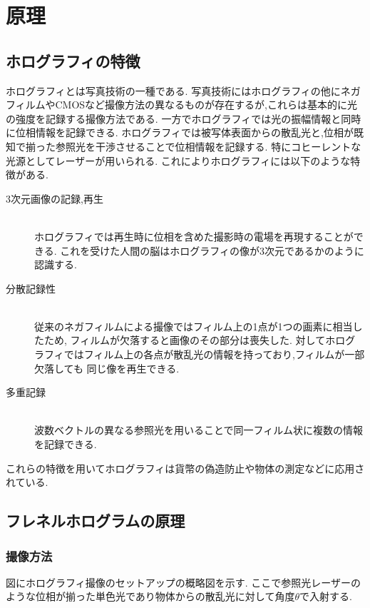\section{原理}
\subsection{ホログラフィの特徴}
ホログラフィとは写真技術の一種である.
写真技術にはホログラフィの他にネガフィルムやCMOSなど撮像方法の異なるものが存在するが,これらは基本的に光の強度を記録する撮像方法である.
一方でホログラフィでは光の振幅情報と同時に位相情報を記録できる.
ホログラフィでは被写体表面からの散乱光と,位相が既知で揃った参照光を干渉させることで位相情報を記録する.
特にコヒーレントな光源としてレーザーが用いられる.
これによりホログラフィには以下のような特徴がある.
\begin{description}
  \item [3次元画像の記録,再生] \text{ }\\
  ホログラフィでは再生時に位相を含めた撮影時の電場を再現することができる.
  これを受けた人間の脳はホログラフィの像が3次元であるかのように認識する.
  \item [分散記録性] \text{ }\\
  従来のネガフィルムによる撮像ではフィルム上の1点が1つの画素に相当したため,
  フィルムが欠落すると画像のその部分は喪失した.
  対してホログラフィではフィルム上の各点が散乱光の情報を持っており,フィルムが一部欠落しても
  同じ像を再生できる.
  \item [多重記録] \text{ }\\
  波数ベクトルの異なる参照光を用いることで同一フィルム状に複数の情報を記録できる.
\end{description}
これらの特徴を用いてホログラフィは貨幣の偽造防止や物体の測定などに応用されている.
\subsection{フレネルホログラムの原理}
\subsubsection{撮像方法}
図にホログラフィ撮像のセットアップの概略図を示す.
ここで参照光レーザーのような位相が揃った単色光であり物体からの散乱光に対して角度$\theta$で入射する.

